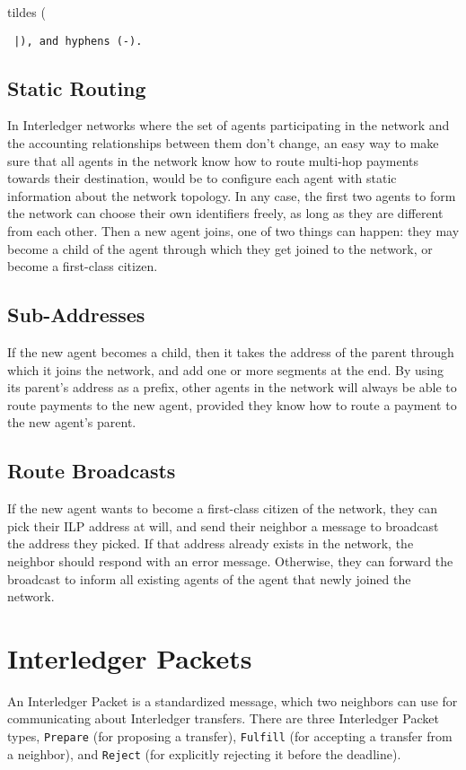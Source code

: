 \documentclass[11pt,twoside,a4paper]{article}
\begin{document}
tildes ({\tt ~|),
and hyphens ({\tt -}).

\subsection{Static Routing}
In Interledger networks where the set of agents participating in the network and the accounting relationships between them don't change,
an easy way to make sure that all agents in the network know how to route multi-hop payments towards their destination, would be to configure each agent with static information about the
network topology. 
In any case, the first two agents to form the network can choose their own identifiers freely, as long as they are different from each other. Then a new agent joins, one of two things can happen:
they may become a child of the agent through which they get joined to the network, or become a first-class citizen.

\subsection{Sub-Addresses}
If the new agent becomes a child, then it takes the address of the parent through which it joins the network, and add one or more segments at the end. By using its parent's address as a
prefix, other agents in the network will always be able to route payments to the new agent, provided they know how to route a payment to the new agent's parent.

\subsection{Route Broadcasts}
If the new agent wants to become a first-class citizen of the network, they can pick their ILP address at will, and send their neighbor a message to broadcast the address they picked.
If that address already exists in the network, the neighbor should respond with an error message. Otherwise, they can forward the broadcast to inform all existing agents of the agent
that newly joined the network.

\section{Interledger Packets}
An Interledger Packet is a standardized message, which two neighbors can use for communicating about Interledger transfers. There are three Interledger Packet
types, {\tt Prepare} (for proposing a transfer), {\tt Fulfill} (for accepting a transfer from a neighbor), and {\tt Reject} (for explicitly rejecting it before the deadline).

}
\end{document}
